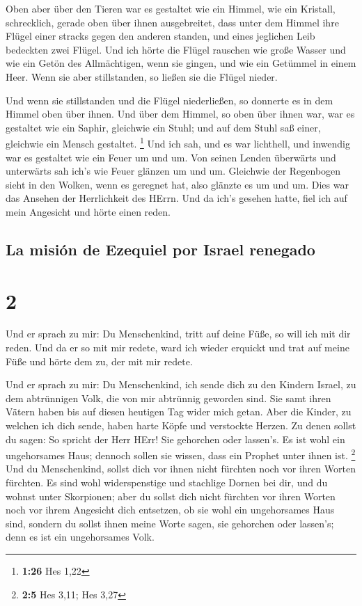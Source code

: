  Oben aber über den Tieren war es gestaltet wie ein
Himmel, wie ein Kristall, schrecklich, gerade oben über ihnen
ausgebreitet,  dass unter dem Himmel ihre Flügel einer
stracks gegen den anderen standen, und eines jeglichen Leib bedeckten
zwei Flügel.  Und ich hörte die Flügel rauschen wie große
Wasser und wie ein Getön des Allmächtigen, wenn sie gingen, und wie ein
Getümmel in einem Heer. Wenn sie aber stillstanden, so ließen sie die
Flügel nieder.

 Und wenn sie stillstanden und die Flügel niederließen,
so donnerte es in dem Himmel oben über ihnen.  Und über
dem Himmel, so oben über ihnen war, war es gestaltet wie ein Saphir,
gleichwie ein Stuhl; und auf dem Stuhl saß einer, gleichwie ein Mensch
gestaltet. \footnote{\textbf{1:26} Hes 1,22}  Und ich
sah, und es war lichthell, und inwendig war es gestaltet wie ein Feuer
um und um. Von seinen Lenden überwärts und unterwärts sah ich's wie
Feuer glänzen um und um.  Gleichwie der Regenbogen sieht
in den Wolken, wenn es geregnet hat, also glänzte es um und um. Dies war
das Ansehen der Herrlichkeit des HErrn. Und da ich's gesehen hatte, fiel
ich auf mein Angesicht und hörte einen reden.

\hypertarget{la-misiuxf3n-de-ezequiel-por-israel-renegado}{%
\subsection{La misión de Ezequiel por Israel
renegado}\label{la-misiuxf3n-de-ezequiel-por-israel-renegado}}

\hypertarget{section-1}{%
\section{2}\label{section-1}}

 Und er sprach zu mir: Du Menschenkind, tritt auf deine
Füße, so will ich mit dir reden.  Und da er so mit mir
redete, ward ich wieder erquickt und trat auf meine Füße und hörte dem
zu, der mit mir redete.

 Und er sprach zu mir: Du Menschenkind, ich sende dich zu
den Kindern Israel, zu dem abtrünnigen Volk, die von mir abtrünnig
geworden sind. Sie samt ihren Vätern haben bis auf diesen heutigen Tag
wider mich getan.  Aber die Kinder, zu welchen ich dich
sende, haben harte Köpfe und verstockte Herzen. Zu denen sollst du
sagen: So spricht der Herr HErr!  Sie gehorchen oder
lassen's. Es ist wohl ein ungehorsames Haus; dennoch sollen sie wissen,
dass ein Prophet unter ihnen ist. \footnote{\textbf{2:5} Hes 3,11; Hes
  3,27}  Und du Menschenkind, sollst dich vor ihnen nicht
fürchten noch vor ihren Worten fürchten. Es sind wohl widerspenstige und
stachlige Dornen bei dir, und du wohnst unter Skorpionen; aber du sollst
dich nicht fürchten vor ihren Worten noch vor ihrem Angesicht dich
entsetzen, ob sie wohl ein ungehorsames Haus sind, 
sondern du sollst ihnen meine Worte sagen, sie gehorchen oder lassen's;
denn es ist ein ungehorsames Volk.

